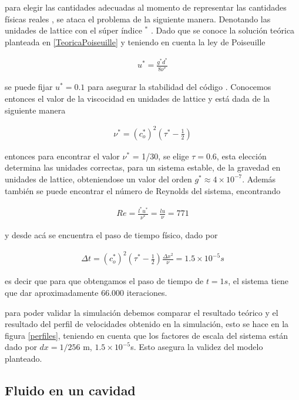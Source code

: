 \noindent para elegir las cantidades adecuadas al momento de representar las cantidades físicas reales , se ataca el problema de la siguiente manera. Denotando las unidades de lattice con el súper índice $^{*}$ . Dado que se conoce la solución teórica planteada en  \eqref{TeoricaPoiseuille} y teniendo en cuenta la ley de Poiseuille 

\begin{eqnarray}
u^{*} = \frac{g^{*}d^{*}}{8\nu^{*}}
\end{eqnarray}

\noindent se puede fijar $u^{*}=0.1$ para asegurar la stabilidad del código \cite{kruger}. Conocemos entonces el valor de la viscocidad en unidades de lattice y está dada de la siguiente manera

\begin{eqnarray}
\nu^{*} = (c_{o}^{*})^{2}\left(\tau^{*}-\frac{1}{2}\right)
\end{eqnarray}

\noindent entonces para encontrar el valor $\nu^{*}$ = 1/30, se elige $\tau =0.6$, esta elección determina las unidades correctas, para un sistema estable,  de la gravedad en unidades de lattice, obteniendose un valor del orden $g^{*} \approx 4\times 10^{-7}$. Además también se puede encontrar el número de Reynolds del sistema, encontrando

\begin{eqnarray}
Re = \frac{l^{*}u^{*}}{\nu^{*}} = \frac{lu}{\nu} =771
\end{eqnarray}

\noindent y desde acá se encuentra el paso de tiempo físico, dado por 

\begin{eqnarray}
\Delta t =(c_{o}^{*})^{2}\left(\tau^{*}-\frac{1}{2}\right)\frac{\Delta x^{2}}{\nu} =1.5\times 10^{-5}s
\end{eqnarray}

\noindent es decir que para que obtengamos el paso de tiempo de $t = 1s$, el sistema tiene que dar aproximadamente $66.000$ iteraciones. 

\medskip

\noindent para poder validar la simulación debemos comparar el resultado teórico y el resultado del perfil de velocidades obtenido en la simulación, esto se hace en la figura \ref{perfiles}, teniendo en cuenta que los factores de escala del sistema están dado por $dx = 1/256$ m, $1.5\times 10^{-5}$s. Esto asegura la validez del modelo planteado.


\subsection{Fluido en un cavidad}

